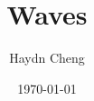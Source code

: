 \documentclass[english,a4paper,12pt]{report}
\title{Waves}
\author{Haydn Cheng}
\date{\today}
\begin{document}
\maketitle
\tableofcontents
    
\chapter{}
\end{document}
